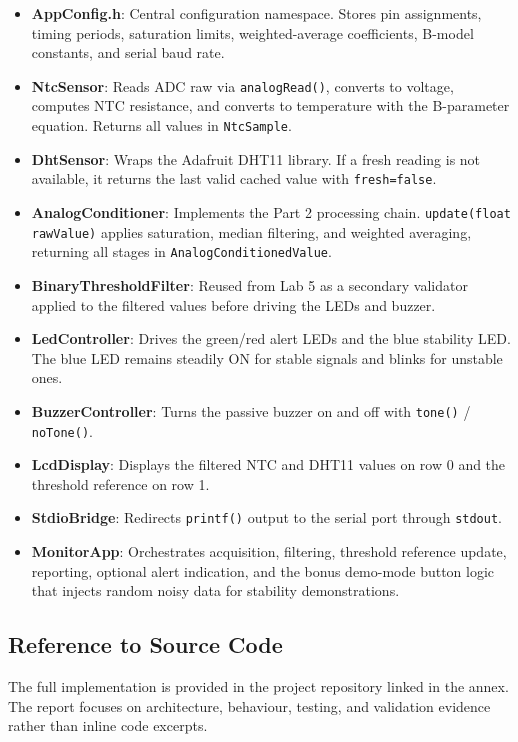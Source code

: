 \documentclass[12pt]{article}
\begin{document}
\begin{itemize}
    \item \textbf{AppConfig.h}: Central configuration namespace. Stores pin assignments, timing periods, saturation limits, weighted-average coefficients, B-model constants, and serial baud rate.
    \item \textbf{NtcSensor}: Reads ADC raw via \texttt{analogRead()}, converts to voltage, computes NTC resistance, and converts to temperature with the B-parameter equation. Returns all values in \texttt{NtcSample}.
    \item \textbf{DhtSensor}: Wraps the Adafruit DHT11 library. If a fresh reading is not available, it returns the last valid cached value with \texttt{fresh=false}.
    \item \textbf{AnalogConditioner}: Implements the Part 2 processing chain. \texttt{update(float rawValue)} applies saturation, median filtering, and weighted averaging, returning all stages in \texttt{AnalogConditionedValue}.
    \item \textbf{BinaryThresholdFilter}: Reused from Lab 5 as a secondary validator applied to the filtered values before driving the LEDs and buzzer.
    \item \textbf{LedController}: Drives the green/red alert LEDs and the blue stability LED. The blue LED remains steadily ON for stable signals and blinks for unstable ones.
    \item \textbf{BuzzerController}: Turns the passive buzzer on and off with \texttt{tone()} / \texttt{noTone()}.
    \item \textbf{LcdDisplay}: Displays the filtered NTC and DHT11 values on row 0 and the threshold reference on row 1.
    \item \textbf{StdioBridge}: Redirects \texttt{printf()} output to the serial port through \texttt{stdout}.
    \item \textbf{MonitorApp}: Orchestrates acquisition, filtering, threshold reference update, reporting, optional alert indication, and the bonus demo-mode button logic that injects random noisy data for stability demonstrations.
\end{itemize}

\subsection{Reference to Source Code}

The full implementation is provided in the project repository linked in the annex. The report focuses on architecture, behaviour, testing, and validation evidence rather than inline code excerpts.
\end{document}
